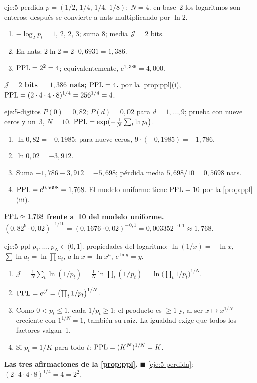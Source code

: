 \begin{solucion}{eje:5-perdida}
\datos $p=(1/2,\,1/4,\,1/4,\,1/8)$; $N=4$.
\planteamiento en base~2 los logaritmos son enteros; después se convierte a nats multiplicando por $\ln 2$.
\pasos
\begin{enumerate}[label=\arabic*.]
  \item $-\log_2 p_t=1,\,2,\,2,\,3$; suma $8$; media $\mathcal J=2$ bits.
  \item En nats: $2\ln 2=2\cdot 0{,}6931=1{,}386$.
  \item $\operatorname{PPL}=2^{2}=4$; equivalentemente, $e^{1{,}386}=4{,}000$.
\end{enumerate}
\resultado \textbf{$\mathcal J=2$ bits $=1{,}386$ nats; $\operatorname{PPL}=4$.}
\comprobacion por la \cref{prop:ppl}(i), $\operatorname{PPL}=(2\cdot 4\cdot 4\cdot 8)^{1/4}=256^{1/4}=4$.
\end{solucion}

\begin{solucion}{eje:5-digitos}
\datos $P(0)=0{,}82$; $P(d)=0{,}02$ para $d=1,\dots,9$; prueba con nueve ceros y un~3, $N=10$.
\planteamiento $\operatorname{PPL}=\exp\bigl(-\frac1N\sum_t\ln p_t\bigr)$.
\pasos
\begin{enumerate}[label=\arabic*.]
  \item $\ln 0{,}82=-0{,}1985$; para nueve ceros, $9\cdot(-0{,}1985)=-1{,}786$.
  \item $\ln 0{,}02=-3{,}912$.
  \item Suma $-1{,}786-3{,}912=-5{,}698$; pérdida media $5{,}698/10=0{,}5698$ nats.
  \item $\operatorname{PPL}=e^{0{,}5698}=1{,}768$. El modelo uniforme tiene $\operatorname{PPL}=10$ por la \cref{prop:ppl}(iii).
\end{enumerate}
\resultado \textbf{$\operatorname{PPL}\approx 1{,}768$ frente a~10 del modelo uniforme.}
\comprobacion $(0{,}82^{9}\cdot 0{,}02)^{-1/10}=(0{,}1676\cdot 0{,}02)^{-0{,}1}=0{,}003352^{-0{,}1}\approx 1{,}768$.
\end{solucion}

\begin{solucion}{eje:5-ppl}
\datos $p_1,\dots,p_N\in(0,1]$.
\planteamiento propiedades del logaritmo: $\ln(1/x)=-\ln x$, $\sum\ln a_t=\ln\prod a_t$, $a\ln x=\ln x^{a}$, $e^{\ln y}=y$.
\pasos
\begin{enumerate}[label=\arabic*.]
  \item $\mathcal J=\frac1N\sum_t\ln(1/p_t)=\frac1N\ln\prod_t(1/p_t)=\ln\bigl(\prod_t 1/p_t\bigr)^{1/N}$.
  \item $\operatorname{PPL}=e^{\mathcal J}=\bigl(\prod_t 1/p_t\bigr)^{1/N}$.
  \item Como $0<p_t\le 1$, cada $1/p_t\ge 1$; el producto es $\ge 1$ y, al ser $x\mapsto x^{1/N}$ creciente con $1^{1/N}=1$, también su raíz. La igualdad exige que todos los factores valgan~1.
  \item Si $p_t=1/K$ para todo $t$: $\operatorname{PPL}=(K^{N})^{1/N}=K$.
\end{enumerate}
\resultado \textbf{Las tres afirmaciones de la \cref{prop:ppl}.} $\blacksquare$
\comprobacion \cref{eje:5-perdida}: $(2\cdot 4\cdot 4\cdot 8)^{1/4}=4=2^{2}$.
\end{solucion}

